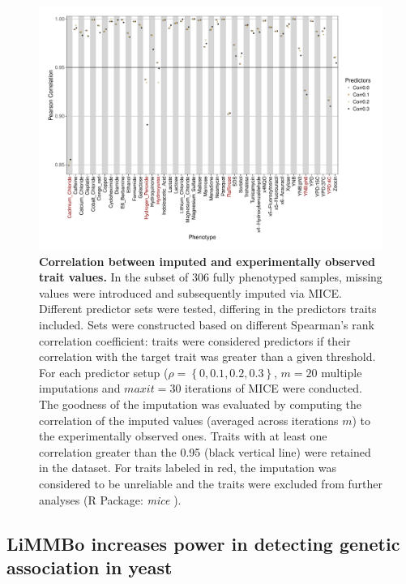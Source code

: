 \begin{figure}[hbtp]
	\centering
	\includegraphics[trim = 0mm 0mm 0mm 0mm, clip, width=01\textwidth]{Chapter1/Figures/20170124_imputation_correlation_median_imputationvalue.pdf}
	\caption{\textbf{Correlation between imputed and experimentally observed trait values.} In the subset of 306 fully phenotyped samples, missing values were introduced and subsequently imputed via MICE. Different predictor sets were tested, differing in the predictors traits included. Sets were constructed based on different Spearman's rank correlation coefficient: traits were considered predictors if their correlation with the target trait was greater than a given threshold. For each predictor setup (\(\rho =\left\{0, 0.1, 0.2, 0.3\right\}\),   \(m=20\) multiple imputations and \(maxit=30\) iterations of MICE were conducted. The goodness of the imputation was evaluated by computing the correlation of the imputed values (averaged across iterations \(m\)) to the experimentally observed ones. Traits with at least one correlation greater than the 0.95 (black vertical line) were retained in the dataset. For traits labeled in red, the imputation was considered to be unreliable and the traits were excluded from further analyses (R Package: \emph{mice} \citep{vanBurren2011}).}
 	\label{fig:mice}
\end{figure}
 


\newpage
 \subsection{LiMMBo increases power in detecting genetic association in yeast}

